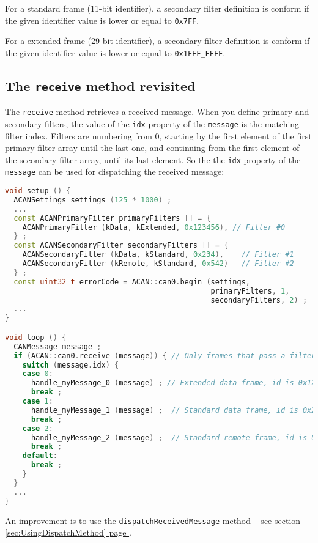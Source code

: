 \documentclass[10pt, a4paper, obeyspaces, openany]{extarticle}
\newcommand\refSectionPage[1]{\hyperref[sec:#1]{section \ref*{sec:#1} page \pageref{sec:#1}}}
\newcommand \subsectionLabel[2]{\subsection{#1}\label{subsec:#2}}
\begin{document}
For a standard frame (11-bit identifier), a secondary filter definition is conform if the given identifier value is lower or equal to \texttt{0x7FF}.

For a extended frame (29-bit identifier), a secondary filter definition is conform if the given identifier value is lower or equal to \texttt{0x1FFF\_FFFF}.




\subsectionLabel{The \texttt{receive} method revisited}{usingIDXvalueWithSecondaryFilter}

The \texttt{receive} method retrieves a received message. When you define primary and secondary filters, the value of the \texttt{idx} property of the \texttt{message} is the matching filter index. Filters are numbering from 0, starting by the first element of the first primary filter array until the last one, and continuing from the first element of the secondary filter array, until its last element. So the the \texttt{idx} property  of the \texttt{message} can be used for dispatching the received message:

{ \small\begin{lstlisting}[language=c++]
void setup () {
  ACANSettings settings (125 * 1000) ;
  ...
  const ACANPrimaryFilter primaryFilters [] = {
    ACANPrimaryFilter (kData, kExtended, 0x123456), // Filter #0
  } ;
  const ACANSecondaryFilter secondaryFilters [] = {
    ACANSecondaryFilter (kData, kStandard, 0x234),    // Filter #1
    ACANSecondaryFilter (kRemote, kStandard, 0x542)   // Filter #2
  } ;
  const uint32_t errorCode = ACAN::can0.begin (settings,
                                               primaryFilters, 1,
                                               secondaryFilters, 2) ;
  ...
}

void loop () {
  CANMessage message ;
  if (ACAN::can0.receive (message)) { // Only frames that pass a filter are retrieved
    switch (message.idx) {
    case 0:
      handle_myMessage_0 (message) ; // Extended data frame, id is 0x123456
      break ;
    case 1:
      handle_myMessage_1 (message) ;  // Standard data frame, id is 0x234
      break ;
    case 2:
      handle_myMessage_2 (message) ;  // Standard remote frame, id is 0x542
      break ;
    default:
      break ;
    }
  }
  ...
}
\end{lstlisting}}

An improvement is to use the \texttt{dispatchReceivedMessage} method -- see \refSectionPage{UsingDispatchMethod}.
\end{document}
